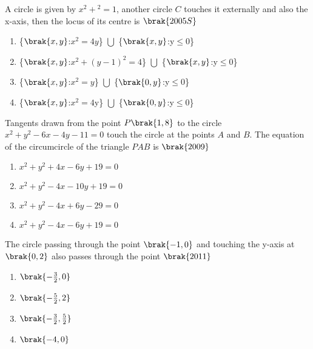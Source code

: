      \item A circle is given by $x^2+$$^2=1$, another circle $C$ touches it externally and also the x-axis, then the locus of its centre is
         \hfill$\brak{2005S}$
         \begin{multicols}{2}
     \begin{enumerate}
         \item \{$\brak{x,y}$:$x^2=4y$\} $\bigcup$ \{$\brak{x,y}$:y$\le$0\}
         \item \{$\brak{x,y}$:$x^2+(y-1)^2=4$\} $\bigcup$ \{$\brak{x,y}$:y$\le$0\}
         \item \{$\brak{x,y}$:$x^2=y$\} $\bigcup$ \{$\brak{0,y}$:y$\le$0\}
         \item \{$\brak{x,y}$:$x^2=4$y\} $\bigcup$ \{$\brak{0,y}$:y$\le$0\}
         \end{enumerate}
         \end{multicols}
         \item Tangents drawn from the point $P\brak{1,8}$ to the circle $x^2+y^2-6x-4y-11=0$ touch the circle at the points $A$ and $B$. The equation of the circumcircle of the triangle $PAB$ is
             \hfill$\brak{2009}$
             \begin{multicols}{2}
         \begin{enumerate}
             \item $x^2+y^2+4x-6y+19=0$
             \item $x^2+y^2-4x-10y+19=0$
             \item $x^2+y^2-4x+6y-29=0$
             \item $x^2+y^2-4x-6y+19=0$
             \end{enumerate}
             \end{multicols}
             \item The circle passing through the point $\brak{-1,0}$ and touching the y-axis at $\brak{0,2}$ also passes through the point
                 \hfill$\brak{2011}$
                 \begin{multicols}{2}
             \begin{enumerate}
                 \item $\brak{-\frac{3}{2},0}$
                 \item $\brak{-\frac{5}{2},2}$
                 \item $\brak{-\frac{3}{2},\frac{5}{2}}$
                 \item $\brak{-4,0}$
             \end{enumerate}
             \end{multicols}
